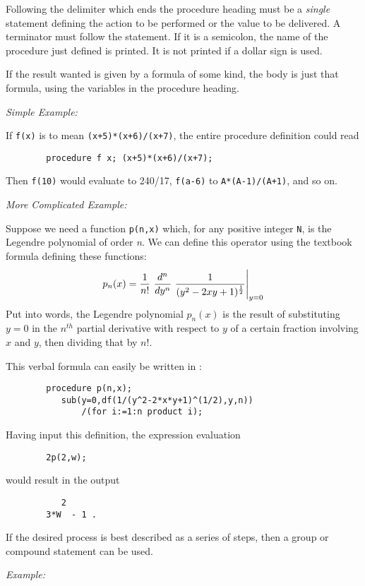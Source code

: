 Following the delimiter which ends the procedure heading must be a {\em
single} statement defining the action to be performed or the value to be
delivered.  A terminator must follow the statement.  If it is a semicolon,
the name of the procedure just defined is printed.  It is not printed if a
dollar sign is used.

If the result wanted is given by a formula of some kind, the body is just
that formula, using the variables in the procedure heading.

{\it Simple Example:}

If {\tt f(x)} is to mean {\tt (x+5)*(x+6)/(x+7)}, the entire procedure
definition could read
\begin{verbatim}
        procedure f x; (x+5)*(x+6)/(x+7);
\end{verbatim}
Then {\tt f(10)} would evaluate to 240/17, {\tt f(a-6)} to
{\tt A*(A-1)/(A+1)}, and so on.

{\it More Complicated Example:}

Suppose we need a function {\tt p(n,x)} which, for any positive integer
{\tt N}, is the Legendre polynomial  of order
{\em n}. We can define this operator using the
textbook formula defining these functions:
\begin{displaymath}
p_n(x) = \displaystyle{1\over{n!}}\  
\displaystyle{d^n\over dy^n}\ \displaystyle{{1\over{(y^2 - 2xy + 1)
^{{1\over2}}}}}\Bigg\vert_{y=0}
\end{displaymath}
Put into words, the Legendre polynomial $p_n(x)$ is the result of
substituting $y=0$ in the $n^{th}$ partial derivative with respect to $y$
of a certain fraction involving $x$ and $y$, then dividing that by $n!$.

This verbal formula can easily be written in {\REDUCE}:
\begin{verbatim}
        procedure p(n,x);
           sub(y=0,df(1/(y^2-2*x*y+1)^(1/2),y,n))
               /(for i:=1:n product i);
\end{verbatim}
Having input this definition, the expression evaluation
\begin{verbatim}
        2p(2,w);
\end{verbatim}
would result in the output
\begin{verbatim}
           2
        3*W  - 1 .
\end{verbatim}
If the desired process is best described as a series of steps, then a group
or compound statement can be used.

{\it Example:}

